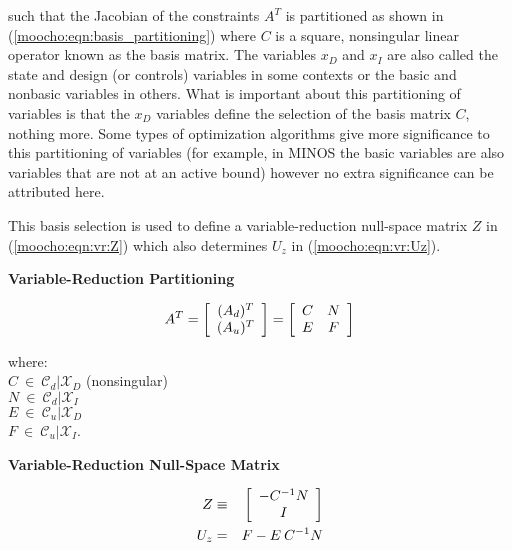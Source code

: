 \documentclass[pdf,ps2pdf,11pt]{SANDreport}
\begin{document}
{{such that the Jacobian of the constraints $A^T$ is partitioned as shown in
(\ref{moocho:eqn:basis_partitioning}) where $C$ is a square, nonsingular
linear operator known as the basis matrix.  The variables $x_D$ and $x_I$ are
also called the state and design (or controls) variables
{}\cite{GBiros_OGhattas_1999a} in some contexts or the basic and nonbasic
variables {}\cite{ref:murtagh_minos_1995} in others.  What is important about
this partitioning of variables is that the $x_D$ variables define the
selection of the basis matrix $C$, nothing more.  Some types of optimization
algorithms give more significance to this partitioning of variables (for
example, in MINOS {}\cite{ref:murtagh_minos_1995} the basic variables are also
variables that are not at an active bound) however no extra significance can
be attributed here.

This basis selection is used to define a variable-reduction null-space matrix
$Z$ in (\ref{moocho:eqn:vr:Z}) which also determines $U_z$ in
(\ref{moocho:eqn:vr:Uz}).

{\bsinglespace
\begin{center}\textbf{Variable-Reduction Partitioning}\end{center}
\begin{equation}
A^T =
{\bmat{c}
(A_d)^T \\
(A_u)^T
\emat}
=
{\bmat{cc}
C & N \\
E & F
\emat}
\label{moocho:eqn:basis_partitioning}
\end{equation} 
\begin{tabbing}
\hspace{4ex}where:\hspace{5ex}\= \\
\>	$C \:\in\:\mathcal{C}_d|\mathcal{X}_D$ \hspace{4ex} (nonsingular)\\
\>	$N \:\in\:\mathcal{C}_d|\mathcal{X}_I$ \\
\>	$E \:\in\:\mathcal{C}_u|\mathcal{X}_D$ \\
\>	$F \:\in\:\mathcal{C}_u|\mathcal{X}_I$.
\end{tabbing}

\begin{center}\textbf{Variable-Reduction Null-Space Matrix}\end{center}
\begin{eqnarray}
Z & \equiv & {\bmat{c} - C^{-1} N \\ I \emat}       \label{moocho:eqn:vr:Z}  \\
U_z & = & F - E \: C^{-1} N                         \label{moocho:eqn:vr:Uz} 
\end{eqnarray}
\esinglespace}

}}
\end{document}
